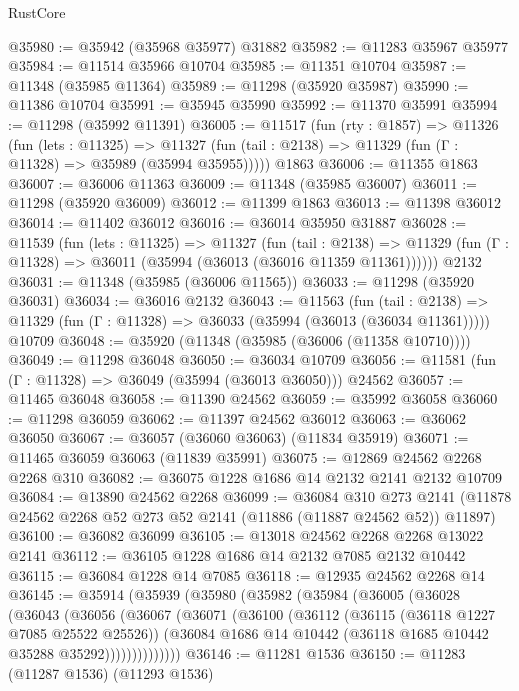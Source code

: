 \begin{lexlean}{RustCore}
\begin{coremodule}
@35980 := @35942 (@35968 @35977) @31882
@35982 := @11283 @35967 @35977
@35984 := @11514 @35966 @10704
@35985 := @11351 @10704
@35987 := @11348 (@35985 @11364)
@35989 := @11298 (@35920 @35987)
@35990 := @11386 @10704
@35991 := @35945 @35990
@35992 := @11370 @35991
@35994 := @11298 (@35992 @11391)
@36005 := @11517
    (fun (rty : @1857) =>
    @11326
      (fun (lets : @11325) =>
      @11327 (fun (tail : @2138) => @11329 (fun (Γ : @11328) => @35989 (@35994 @35955)))))
    @1863
@36006 := @11355 @1863
@36007 := @36006 @11363
@36009 := @11348 (@35985 @36007)
@36011 := @11298 (@35920 @36009)
@36012 := @11399 @1863
@36013 := @11398 @36012
@36014 := @11402 @36012
@36016 := @36014 @35950 @31887
@36028 := @11539
    (fun (lets : @11325) =>
    @11327
      (fun (tail : @2138) =>
      @11329 (fun (Γ : @11328) => @36011 (@35994 (@36013 (@36016 @11359 @11361))))))
    @2132
@36031 := @11348 (@35985 (@36006 @11565))
@36033 := @11298 (@35920 @36031)
@36034 := @36016 @2132
@36043 := @11563
    (fun (tail : @2138) => @11329 (fun (Γ : @11328) => @36033 (@35994 (@36013 (@36034 @11361)))))
    @10709
@36048 := @35920 (@11348 (@35985 (@36006 (@11358 @10710))))
@36049 := @11298 @36048
@36050 := @36034 @10709
@36056 := @11581 (fun (Γ : @11328) => @36049 (@35994 (@36013 @36050))) @24562
@36057 := @11465 @36048
@36058 := @11390 @24562
@36059 := @35992 @36058
@36060 := @11298 @36059
@36062 := @11397 @24562 @36012
@36063 := @36062 @36050
@36067 := @36057 (@36060 @36063) (@11834 @35919)
@36071 := @11465 @36059 @36063 (@11839 @35991)
@36075 := @12869 @24562 @2268 @2268 @310
@36082 := @36075 @1228 @1686 @14 @2132 @2141 @2132 @10709
@36084 := @13890 @24562 @2268
@36099 := @36084
    @310
    @273
    @2141
    (@11878 @24562 @2268 @52 @273 @52 @2141 (@11886 (@11887 @24562 @52)) @11897)
@36100 := @36082 @36099
@36105 := @13018 @24562 @2268 @2268 @13022 @2141
@36112 := @36105 @1228 @1686 @14 @2132 @7085 @2132 @10442
@36115 := @36084 @1228 @14 @7085
@36118 := @12935 @24562 @2268 @14
@36145 := @35914
    (@35939
      (@35980
        (@35982
          (@35984
            (@36005
              (@36028
                (@36043
                  (@36056
                    (@36067
                      (@36071
                        (@36100
                          (@36112
                            (@36115 (@36118 @1227 @7085 @25522 @25526))
                            (@36084
                              @1686
                              @14
                              @10442
                              (@36118 @1685 @10442 @35288 @35292))))))))))))))
@36146 := @11281 @1536
@36150 := @11283 (@11287 @1536) (@11293 @1536)

\end{coremodule}
\end{lexlean}
